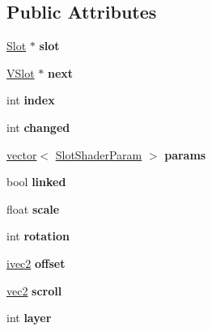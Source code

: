 \subsection*{Public Attributes}
\begin{DoxyCompactItemize}
\item 
\mbox{\label{struct_v_slot_a440167648540f0d4ab8b537f09f2c4f9}} 
\hyperlink{struct_slot}{Slot} $\ast$ {\bfseries slot}
\item 
\mbox{\label{struct_v_slot_a4faf48726fea5192a9c01b47c9775591}} 
\hyperlink{struct_v_slot}{V\+Slot} $\ast$ {\bfseries next}
\item 
\mbox{\label{struct_v_slot_a00002229e353db4e4cef55bb4daf0b6e}} 
int {\bfseries index}
\item 
\mbox{\label{struct_v_slot_af5871d4d04f27613c6d56bc374a93843}} 
int {\bfseries changed}
\item 
\mbox{\label{struct_v_slot_a0c12b0db10ccfd96d098f650753f0613}} 
\hyperlink{structvector}{vector}$<$ \hyperlink{struct_slot_shader_param}{Slot\+Shader\+Param} $>$ {\bfseries params}
\item 
\mbox{\label{struct_v_slot_aa8c1c1c60cd6d3e8cdc0b33c7761267f}} 
bool {\bfseries linked}
\item 
\mbox{\label{struct_v_slot_a70fabc507c813b2f7a7bc615028b9ed7}} 
float {\bfseries scale}
\item 
\mbox{\label{struct_v_slot_a944c0a9b4b21d60265d7bc0904802e0d}} 
int {\bfseries rotation}
\item 
\mbox{\label{struct_v_slot_a0ed7e1884c6b516b76066355ff69c0de}} 
\hyperlink{structivec2}{ivec2} {\bfseries offset}
\item 
\mbox{\label{struct_v_slot_afee4ac7c6fa1014095b59895b5b2fc50}} 
\hyperlink{structvec2}{vec2} {\bfseries scroll}
\item 
\mbox{\label{struct_v_slot_a569f5f01d467aa86cdc6355c6ccb0beb}} 
int {\bfseries layer}

\end{DoxyCompactItemize}
